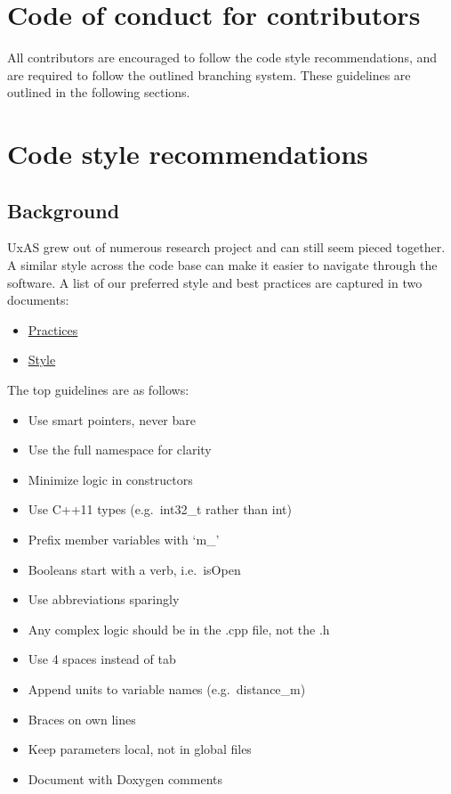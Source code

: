 \section{Code of conduct for
contributors}\label{code-of-conduct-for-contributors}

All contributors are encouraged to follow the code style
recommendations, and are required to follow the outlined branching
system. These guidelines are outlined in the following sections.

\section{Code style recommendations}\label{code-style-recommendations}

\subsection{Background}\label{background}

UxAS grew out of numerous research project and can still seem pieced
together. A similar style across the code base can make it easier to
navigate through the software. A list of our preferred style and best
practices are captured in two documents:

\begin{itemize}
\item
  \href{run:../../doxygen/files/CppProgrammingPracticesGuide.html}{Practices}
\item
  \href{run:../../doxygen/files/CppProgrammingStyleGuide.html}{Style}
\end{itemize}

The top guidelines are as follows:

\begin{itemize}
\item
  Use smart pointers, never bare
\item
  Use the full namespace for clarity
\item
  Minimize logic in constructors
\item
  Use C++11 types (e.g.~int32\_t rather than int)
\item
  Prefix member variables with `m\_'
\item
  Booleans start with a verb, i.e.~isOpen
\item
  Use abbreviations sparingly
\item
  Any complex logic should be in the .cpp file, not the .h
\item
  Use 4 spaces instead of tab
\item
  Append units to variable names (e.g.~distance\_m)
\item
  Braces on own lines
\item
  Keep parameters local, not in global files
\item
  Document with Doxygen comments
\end{itemize}

